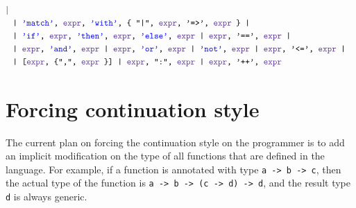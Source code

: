 \documentclass{article}
\begin{document}
\begin{align*}
{|}\\
&\texttt{
	| \color{blue}'match'\color{black}, \color{RoyalPurple}expr\color{black}, \color{blue}'with'\color{black}, \{ "|", \color{RoyalPurple}expr\color{black}, '=>', \color{RoyalPurple}expr \color{black} \}
|}\\
&\texttt{
	| \color{blue}'if'\color{black}, \color{RoyalPurple}expr\color{black}, \color{blue}'then'\color{black}, \color{RoyalPurple}expr\color{black}, \color{blue}'else'\color{black}, \color{RoyalPurple}expr \color{black}
	| \color{RoyalPurple}expr\color{black}, '==',
	\color{RoyalPurple}expr \color{black}
|}\\
&\texttt{
	| \color{RoyalPurple}expr\color{black}, \color{blue}'and'\color{black}, \color{RoyalPurple}expr \color{black}
	| \color{RoyalPurple}expr\color{black}, \color{blue} 'or'\color{black}, \color{RoyalPurple}expr \color{black}
	| \color{blue} 'not'\color{black}, \color{RoyalPurple}expr \color{black} 
	| \color{RoyalPurple}expr\color{black}, '<=', \color{RoyalPurple}expr \color{black}
|}\\
&\texttt{
	| [\color{RoyalPurple}expr\color{black}, \{",", \color{RoyalPurple}expr \color{black}\}]
	| \color{RoyalPurple} expr\color{black}, ":", \color{RoyalPurple}expr \color{black}
	| \color{RoyalPurple}expr\color{black}, '++', \color{RoyalPurple}expr \color{black}
}
\end{align*}
\section{Forcing continuation style}
The current plan on forcing the continuation style on the programmer is to add an implicit modification on the type of all functions that are defined in the language. For example, if a function is annotated with type \texttt{a -> b -> c}, then the actual type of the function is \texttt{a -> b -> (c -> d) -> d}, and the result type \texttt{d} is always generic.
\end{document}
